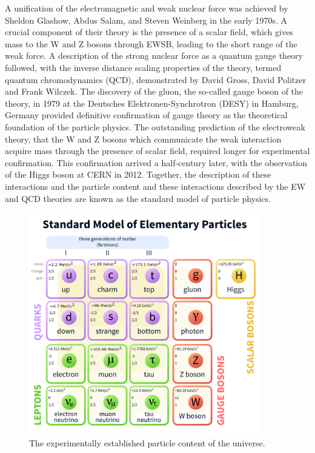 A unification of the electromagnetic and weak nuclear force was achieved
by Sheldon Glashow, Abdus Salam, and Steven Weinberg in the early 1970s.
A crucial component of their theory is the presence of a scalar field, 
which gives mass to the W and Z bosons through EWSB, leading to the 
short range of the weak force.
A description of the strong nuclear force as a quantum 
gauge theory followed,
with the inverse distance scaling properties of the theory,
termed quantum chromodynamics (QCD), demonstrated by
David Gross, David Politzer and Frank Wilczek.
The discovery of the gluon, the so-called gauge boson of the theory,
in 1979 at the Deutsches Elektronen-Synchrotron (DESY) in Hamburg, Germany
provided definitive confirmation
of gauge theory as the theoretical foundation of the particle physics.
The outstanding prediction of the 
electroweak theory, that the W and Z bosons which communicate the weak 
interaction acquire mass through the presence of scalar field, required
longer for experimental confirmation. This confirmation arrived a half-century
later, with the observation of the Higgs boson at CERN in 2012.
Together, the description of these interactions and the particle content
and these interactions described by the EW and QCD theories are known
as the standard model of particle physics.

\begin{figure}[htbp]
  \centering
   \includegraphics[width=0.9\textwidth]{figures/Chapter1/ChartOfParticles.png}
  \caption{
    The experimentally established particle content of the universe.
  }
 \label{fig:theparticles}
\end{figure}

